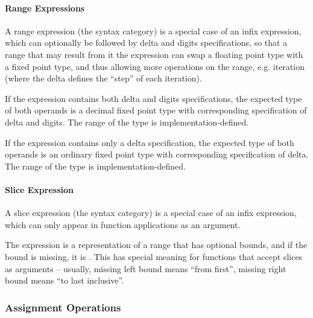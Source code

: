 




\paragraph{Range Expressions}
A range expression (the  syntax category) is a special case of an infix expression, which can optionally be followed by delta and digits specifications, so that a range that may result from it the expression can swap a floating point type with a fixed point type, and thus allowing more operations on the range, e.g. iteration (where the delta defines the ``step'' of each iteration). 

If the expression contains both delta and digits specifications, the expected type of both operands is a decimal fixed point type with corresponding specification of delta and digits. The range of the type is implementation-defined. 

If the expression contains only a delta specification, the expected type of both operands is an ordinary fixed point type with corresponding specification of delta. The range of the type is implementation-defined. 




\paragraph{Slice Expression}
A slice expression (the  syntax category) is a special case of an infix expression, which can only appear in function applications as an argument. 

The expression is a representation of a range that has optional bounds, and if the bound is missing, it is . This has special meaning for functions that accept slices as arguments -- usually, missing left bound means ``from first'', missing right bound means ``to last inclusive''. 




\subsubsection{Assignment Operations}
\label{sec:assignment-operations}

